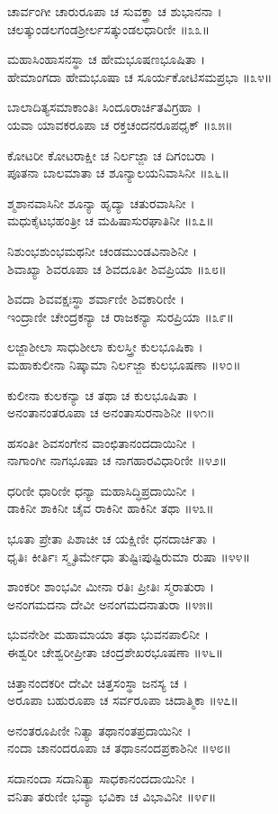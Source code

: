 ಚಾರ್ವಂಗೀ ಚಾರುರೂಪಾ ಚ ಸುವಕ್ತ್ರಾ ಚ ಶುಭಾನನಾ ।\\
ಚಲತ್ಕುಂಡಲಗಂಡಶ್ರೀರ್ಲಸತ್ಕುಂಡಲಧಾರಿಣೀ ॥೩೩॥

ಮಹಾಸಿಂಹಾಸನಸ್ಥಾ ಚ ಹೇಮಭೂಷಣಭೂಷಿತಾ ।\\
ಹೇಮಾಂಗದಾ ಹೇಮಭೂಷಾ ಚ ಸೂರ್ಯಕೋಟಿಸಮಪ್ರಭಾ ॥೩೪॥

ಬಾಲಾದಿತ್ಯಸಮಾಕಾಂತಿಃ ಸಿಂದೂರಾರ್ಚಿತವಿಗ್ರಹಾ ।\\
ಯವಾ ಯಾವಕರೂಪಾ ಚ ರಕ್ತಚಂದನರೂಪಧೃಕ್ ॥೩೫॥

ಕೋಟರೀ ಕೋಟರಾಕ್ಷೀ ಚ ನಿರ್ಲಜ್ಜಾ ಚ ದಿಗಂಬರಾ ।\\
ಪೂತನಾ ಬಾಲಮಾತಾ ಚ ಶೂನ್ಯಾಲಯನಿವಾಸಿನೀ ॥೩೬॥

ಶ್ಮಶಾನವಾಸಿನೀ ಶೂನ್ಯಾ ಹೃದ್ಯಾ ಚತುರವಾಸಿನೀ ।\\
ಮಧುಕೈಟಭಹಂತ್ರೀ ಚ ಮಹಿಷಾಸುರಘಾತಿನೀ ॥೩೭॥

ನಿಶುಂಭಶುಂಭಮಥನೀ ಚಂಡಮುಂಡವಿನಾಶಿನೀ ।\\
ಶಿವಾಖ್ಯಾ ಶಿವರೂಪಾ ಚ ಶಿವದೂತೀ ಶಿವಪ್ರಿಯಾ ॥೩೮॥

ಶಿವದಾ ಶಿವವಕ್ಷಃಸ್ಥಾ ಶರ್ವಾಣೀ ಶಿವಕಾರಿಣೀ ।\\
ಇಂದ್ರಾಣೀ ಚೇಂದ್ರಕನ್ಯಾ ಚ ರಾಜಕನ್ಯಾ ಸುರಪ್ರಿಯಾ ॥೩೯॥

ಲಜ್ಜಾಶೀಲಾ ಸಾಧುಶೀಲಾ ಕುಲಸ್ತ್ರೀ ಕುಲಭೂಷಿಕಾ ।\\
ಮಹಾಕುಲೀನಾ ನಿಷ್ಕಾಮಾ ನಿರ್ಲಜ್ಜಾ ಕುಲಭೂಷಣಾ ॥೪೦॥

ಕುಲೀನಾ ಕುಲಕನ್ಯಾ ಚ ತಥಾ ಚ ಕುಲಭೂಷಿತಾ ।\\
ಅನಂತಾನಂತರೂಪಾ ಚ ಅನಂತಾಸುರನಾಶಿನೀ ॥೪೧॥

ಹಸಂತೀ ಶಿವಸಂಗೇನ ವಾಂಛಿತಾನಂದದಾಯಿನೀ ।\\
ನಾಗಾಂಗೀ ನಾಗಭೂಷಾ ಚ ನಾಗಹಾರವಿಧಾರಿಣೀ ॥೪೨॥

ಧರಿಣೀ ಧಾರಿಣೀ ಧನ್ಯಾ ಮಹಾಸಿದ್ಧಿಪ್ರದಾಯಿನೀ ।\\
ಡಾಕಿನೀ ಶಾಕಿನೀ ಚೈವ ರಾಕಿನೀ ಹಾಕಿನೀ ತಥಾ ॥೪೩॥

ಭೂತಾ ಪ್ರೇತಾ ಪಿಶಾಚೀ ಚ ಯಕ್ಷಿಣೀ ಧನದಾರ್ಚಿತಾ ।\\
ಧೃತಿಃ ಕೀರ್ತಿಃ ಸ್ಮೃತಿರ್ಮೇಧಾ ತುಷ್ಟಿಃಪುಷ್ಟಿರುಮಾ ರುಷಾ ॥೪೪॥

ಶಾಂಕರೀ ಶಾಂಭವೀ ಮೀನಾ ರತಿಃ ಪ್ರೀತಿಃ ಸ್ಮರಾತುರಾ ।\\
ಅನಂಗಮದನಾ ದೇವೀ ಅನಂಗಮದನಾತುರಾ ॥೪೫॥

ಭುವನೇಶೀ ಮಹಾಮಾಯಾ ತಥಾ ಭುವನಪಾಲಿನೀ ।\\
ಈಶ್ವರೀ ಚೇಶ್ವರೀಪ್ರೀತಾ ಚಂದ್ರಶೇಖರಭೂಷಣಾ ॥೪೬॥

ಚಿತ್ತಾನಂದಕರೀ ದೇವೀ ಚಿತ್ತಸಂಸ್ಥಾ ಜನಸ್ಯ ಚ ।\\
ಅರೂಪಾ ಬಹುರೂಪಾ ಚ ಸರ್ವರೂಪಾ ಚಿದಾತ್ಮಿಕಾ ॥೪೭॥

ಅನಂತರೂಪಿಣೀ ನಿತ್ಯಾ ತಥಾನಂತಪ್ರದಾಯಿನೀ ।\\
ನಂದಾ ಚಾನಂದರೂಪಾ ಚ ತಥಾಽನಂದಪ್ರಕಾಶಿನೀ ॥೪೮॥

ಸದಾನಂದಾ ಸದಾನಿತ್ಯಾ ಸಾಧಕಾನಂದದಾಯಿನೀ ।\\
ವನಿತಾ ತರುಣೀ ಭವ್ಯಾ ಭವಿಕಾ ಚ ವಿಭಾವಿನೀ ॥೪೯॥


